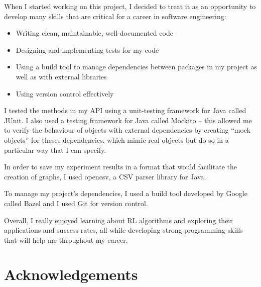 \documentclass[11pt,a4paper]{report}
\begin{document}
When I started working on this project, I decided to treat it as an opportunity to develop many skills that are critical for a career in software engineering:

\begin{itemize}
	\item Writing clean, maintainable, well-documented code
	\item Designing and implementing tests for my code
	\item Using a build tool to manage dependencies between packages in my project as well as with external libraries
	\item Using version control effectively
\end{itemize}

I tested the methods in my API using a unit-testing framework for Java called JUnit. I also used a testing framework for Java called Mockito – this allowed me to verify the behaviour of objects with external dependencies by creating “mock objects” for theses dependencies, which mimic real objects but do so in a particular way that I can specify.

In order to save my experiment results in a format that would facilitate the creation of graphs, I used opencsv, a CSV parser library for Java.

To manage my project’s dependencies, I used a build tool developed by Google called Bazel and I used Git for version control.

Overall, I really enjoyed learning about RL algorithms and exploring their applications and success rates, all while developing strong programming skills that will help me throughout my career.


\chapter{Acknowledgements}



{}

\end{document}
